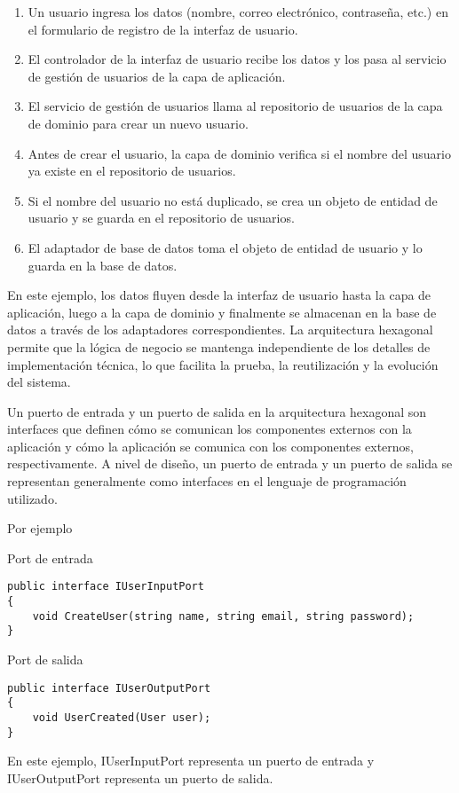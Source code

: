 \documentclass[executivepaper]{article}
\begin{document}
\begin{enumerate}
    \item Un usuario ingresa los datos (nombre, correo electrónico, contraseña, etc.) en el formulario de registro de la interfaz de usuario.
    \item El controlador de la interfaz de usuario recibe los datos y los pasa al servicio de gestión de usuarios de la capa de aplicación.
    \item El servicio de gestión de usuarios llama al repositorio de usuarios de la capa de dominio para crear un nuevo usuario.
    \item Antes de crear el usuario, la capa de dominio verifica si el nombre del usuario ya existe en el repositorio de usuarios.
    \item Si el nombre del usuario no está duplicado, se crea un objeto de entidad de usuario y se guarda en el repositorio de usuarios.
    \item El adaptador de base de datos toma el objeto de entidad de usuario y lo guarda en la base de datos.
\end{enumerate}
En este ejemplo, los datos fluyen desde la interfaz de usuario hasta la capa de aplicación, luego a la capa de dominio y finalmente se almacenan en la base de datos a través de los adaptadores correspondientes. La arquitectura hexagonal permite que la lógica de negocio se mantenga independiente de los detalles de implementación técnica, lo que facilita la prueba, la reutilización y la evolución del sistema.

Un puerto de entrada y un puerto de salida en la arquitectura hexagonal son interfaces que definen cómo se comunican los componentes externos con la aplicación y cómo la aplicación se comunica con los componentes externos, respectivamente. A nivel de diseño, un puerto de entrada y un puerto de salida se representan generalmente como interfaces en el lenguaje de programación utilizado.

Por ejemplo 

Port de entrada
\begin{lstlisting}
public interface IUserInputPort
{
    void CreateUser(string name, string email, string password);
}
\end{lstlisting}

Port de salida
\begin{lstlisting}
public interface IUserOutputPort
{
    void UserCreated(User user);
}
\end{lstlisting}

En este ejemplo, IUserInputPort representa un puerto de entrada y IUserOutputPort representa un puerto de salida.
\end{document}
